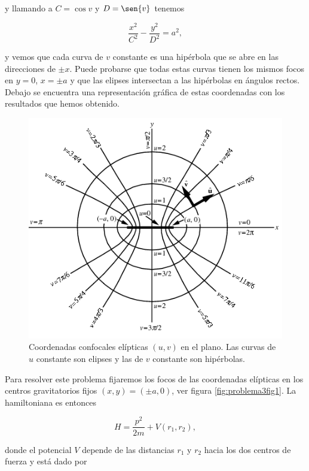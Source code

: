 \documentclass[a4paper,10pt]{article}
\numberwithin{equation}{section}
\begin{document}
y llamando a $C = \cos{v}$ y $D = \sen{v}$ tenemos 

\begin{equation}
 \frac{x^2}{C^2} - \frac{y^2}{D^2} = a^2,
\end{equation}

y vemos que cada curva de $v$ constante es una hipérbola que se abre en las direcciones 
de $\pm x$. Puede probarse \cite{arfken} que todas estas curvas tienen los mismos focos en $y=0$, 
$x= \pm a$ y que las elipses intersectan a las hipérbolas en ángulos rectos. Debajo se encuentra 
una representación gráfica de estas coordenadas con los resultados que hemos obtenido.

\begin{figure}[H]
 \center 
 \includegraphics[scale=0.7]{problema3fig1}
 \caption{Coordenadas confocales elípticas $(u,v)$ en el plano. Las curvas de 
 $u$ constante son elipses y las de $v$ constante son hipérbolas.}
 \label{fig:problema3fig1}
\end{figure}

Para resolver este problema fijaremos los focos de las coordenadas elípticas en los 
centros gravitatorios fijos $(x,y) = (\pm a,0)$, ver figura \eqref{fig:problema3fig1}. La hamiltoniana es entonces 

\begin{equation}
 H = \frac{p^2}{2m} + V(r_1,r_2),
\end{equation}

donde el potencial $V$ depende de las distancias $r_1$ y $r_2$ hacia los dos 
centros de fuerza y está dado por 
\end{document}
